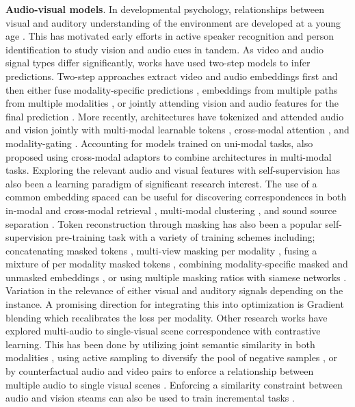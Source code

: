 \documentclass[smallextended,twocolumn,natbib]{svjour3}
\begin{document}
\noindent
\textbf{Audio-visual models}. In developmental psychology, relationships between visual and auditory understanding of the environment are developed at a young age \citep{morrongiello1998developmental}. This has motivated early efforts in active speaker recognition \citep{chen1998audio,matthews2002extraction} and person identification \citep{aleksic2006audio} to study vision and audio cues in tandem. As video and audio signal types differ significantly, works have used two-step models to infer predictions. Two-step approaches extract video and audio embeddings first and then either fuse modality-specific predictions \citep{fayek2020large}, embeddings from multiple paths from multiple modalities \citep{xiao2020audiovisual}, or jointly attending vision and audio features for the final prediction \citep{gong2022uavm}. More recently, architectures have tokenized and attended audio and vision jointly with multi-modal learnable tokens \citep{nagrani2021attention}, cross-modal attention \citep{jaegle2021perceiver}, and modality-gating \citep{xue2023dynamic}. Accounting for models trained on uni-modal tasks, \citet{lin2023vision} also proposed using cross-modal adaptors to combine architectures in multi-modal tasks. Exploring the relevant audio and visual features with self-supervision has also been a learning paradigm of significant research interest. The use of a common embedding spaced can be useful for discovering correspondences in both in-modal and cross-modal retrieval \citep{arandjelovic2018objects,wu2021exploring}, multi-modal clustering \citep{hu2019deep}, and sound source separation \citep{hu2022mix,mo2023unified,zhao2018sound}. Token reconstruction through masking has also been a popular self-supervision pre-training task with a variety of training schemes including; concatenating masked tokens \citep{gong2023contrastive}, multi-view masking per modality \citep{huang2023mavil}, fusing a mixture of per modality masked tokens \citep{guo2024crossmae}, combining modality-specific masked and unmasked embeddings \citep{georgescu2023audiovisual}, or using multiple masking ratios with siamese networks \citep{lin2024siamese}. 
Variation in the relevance of either visual and auditory signals depending on the instance. A promising direction for integrating this into optimization is Gradient blending \citep{wang2020makes} which recalibrates the loss per modality. Other research works have explored multi-audio to single-visual scene correspondence with contrastive learning. This has been done by utilizing joint semantic similarity in both modalities \citep{morgado2021audio}, using active sampling to diversify the pool of negative samples
\citep{ma2021active}, or by counterfactual audio and video pairs to enforce a relationship between multiple audio to single visual scenes \citep{singh2024looking}. Enforcing a similarity constraint between audio and vision steams can also be used to train incremental tasks \citep{pian2023audio}.
\end{document}
